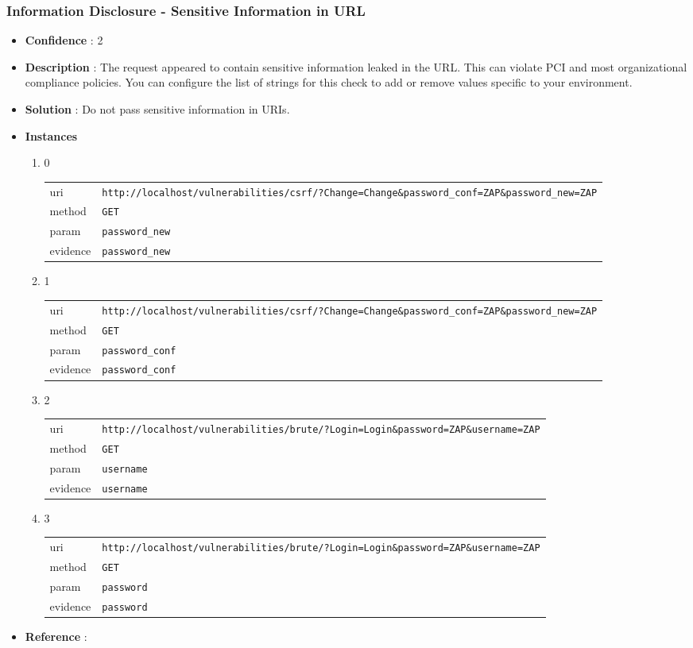 \documentclass[10pt]{article}
\begin{document}
\subsubsection{Information Disclosure - Sensitive Information in URL}
\begin{itemize}
\item[] \textbf{Confidence} : 2
\item[] \textbf{Description} : The request appeared to contain sensitive information leaked in the URL. This can violate PCI and most organizational compliance policies. You can configure the list of strings for this check to add or remove values specific to your environment.
\item[] \textbf{Solution} :  Do not pass sensitive information in URIs.
\item[] \textbf{Instances}
\begin{enumerate}
\item[] 0
\begin{tabular}{| l | p{12cm}}
uri & \texttt{http://localhost/vulnerabilities/csrf/?Change=Change\&password\_conf=ZAP\&password\_new=ZAP} \\
method & \texttt{GET} \\
param & \texttt{password\_new} \\
evidence & \texttt{password\_new} \\
\end{tabular}
\item[] 1
\begin{tabular}{| l | p{12cm}}
uri & \texttt{http://localhost/vulnerabilities/csrf/?Change=Change\&password\_conf=ZAP\&password\_new=ZAP} \\
method & \texttt{GET} \\
param & \texttt{password\_conf} \\
evidence & \texttt{password\_conf} \\
\end{tabular}
\item[] 2
\begin{tabular}{| l | p{12cm}}
uri & \texttt{http://localhost/vulnerabilities/brute/?Login=Login\&password=ZAP\&username=ZAP} \\
method & \texttt{GET} \\
param & \texttt{username} \\
evidence & \texttt{username} \\
\end{tabular}
\item[] 3
\begin{tabular}{| l | p{12cm}}
uri & \texttt{http://localhost/vulnerabilities/brute/?Login=Login\&password=ZAP\&username=ZAP} \\
method & \texttt{GET} \\
param & \texttt{password} \\
evidence & \texttt{password} \\
\end{tabular}
\end{enumerate}
\item[] \textbf{Reference} : 
\end{itemize}
\end{document}
